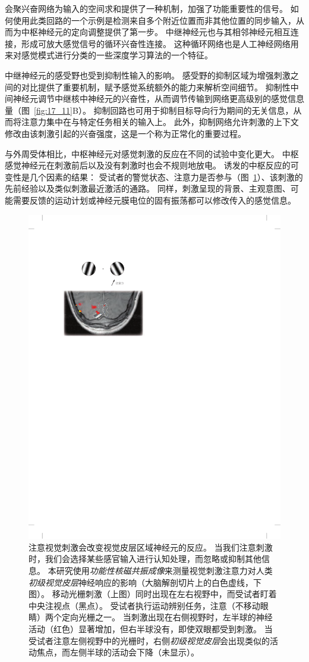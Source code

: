会聚兴奋网络为输入的空间求和提供了一种机制，加强了功能重要性的信号。 
如何使用此类回路的一个示例是检测来自多个附近位置而非其他位置的同步输入，从而为中枢神经元的定向调整提供了第一步。 
中继神经元也与其相邻神经元相互连接，形成可放大感觉信号的循环兴奋性连接。 
这种循环网络也是人工神经网络用来对感觉模式进行分类的一些深度学习算法的一个特征。


中继神经元的感受野也受到抑制性输入的影响。 
感受野的抑制区域为增强刺激之间的对比提供了重要机制，赋予感觉系统额外的能力来解析空间细节。 
抑制性中间神经元调节中继核中神经元的兴奋性，从而调节传输到网络更高级别的感觉信息量（图~\ref{fig:17_11}B）。 
抑制回路也可用于抑制目标导向行为期间的无关信息，从而将注意力集中在与特定任务相关的输入上。 
此外，抑制网络允许刺激的上下文修改由该刺激引起的兴奋强度，这是一个称为正常化的重要过程。


与外周受体相比，中枢神经元对感觉刺激的反应在不同的试验中变化更大。 
中枢感觉神经元在刺激前后以及没有刺激时也会不规则地放电。 
诱发的中枢反应的可变性是几个因素的结果：
受试者的警觉状态、注意力是否参与（图~\ref{fig:17_12}）、该刺激的先前经验以及类似刺激最近激活的通路。 
同样，刺激呈现的背景、主观意图、可能需要反馈的运动计划或神经元膜电位的固有振荡都可以修改传入的感觉信息。


\begin{figure}[htbp]
	\centering
	\includegraphics[width=0.5\linewidth]{chap17/fig_17_12}
	\caption{注意视觉刺激会改变视觉皮层区域神经元的反应。 
		当我们注意刺激时，我们会选择某些感官输入进行认知处理，而忽略或抑制其他信息。
		本研究使用\textit{功能性核磁共振成像}来测量视觉刺激注意力对人类\textit{初级视觉皮层}神经响应的影响（大脑解剖切片上的白色虚线，下图）。 
		移动光栅刺激（上图）同时出现在左右视野中，而受试者盯着中央注视点（黑点）。 
		受试者执行运动辨别任务，注意（不移动眼睛）两个定向光栅之一。 
		当刺激出现在右侧视野时，左半球的神经活动（红色）显著增加，但右半球没有，即使双眼都受到刺激。 
		当受试者注意左侧视野中的光栅时，右侧\textit{初级视觉皮层}会出现类似的活动焦点，而左侧半球的活动会下降（未显示）\cite{gandhi1999spatial}。}
	\label{fig:17_12}
\end{figure}


